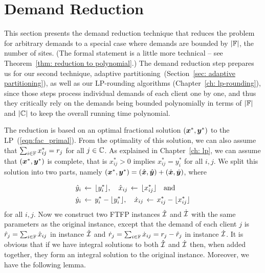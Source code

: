 \documentclass[oneside,final]{ucr}
\def\dsp{\def\baselinestretch{2.0}\large\normalsize}
\def\ssp{\def\baselinestretch{1.0}\large\normalsize}
\begin{document}
\section{Demand Reduction}
\label{sec: polynomial demands}

This section presents the demand reduction technique that
reduces the {\FTFP} problem for arbitrary demands to a
special case where demands are bounded by $|\mathbb{F}|$, the
number of sites.  (The formal statement is a little more
technical -- see Theorem~\ref{thm: reduction to
  polynomial}.)  The demand reduction step prepares us for
our second technique, adaptive
partitioning~(Section~\ref{sec: adaptive partitioning}), as
well as our LP-rounding algorithms (Chapter~\ref{ch:
  lp-rounding}), since those steps process individual
demands of each client one by one, and thus they critically
rely on the demands being bounded polynomially in terms of
$|\mathbb{F}|$ and $|\mathbb{C}|$ to keep the overall running
time polynomial.

The reduction is based on an optimal fractional solution
$(\boldsymbol{x}^\ast,\boldsymbol{y}^\ast)$ to the
LP~(\ref{eqn:fac_primal}). From the optimality of this
solution, we can also assume that $\sum_{i\in\mathbb{F}}
x^\ast_{ij} = r_j$ for all $j\in\mathbb{C}$.  As explained
in Chapter~\ref{ch: lp}, we can assume that
$(\boldsymbol{x}^\ast,\boldsymbol{y}^\ast)$ is complete, that is $x^\ast_{ij} >
0$ implies $x^\ast_{ij} = y^\ast_i$ for all $i,j$.  We split
this solution into two parts, namely $(\boldsymbol{x}^\ast,\boldsymbol{y}^\ast)
= (\hat{\boldsymbol{x}},\hat{\boldsymbol{y}})+ (\dot{\boldsymbol{x}},\dot{\boldsymbol{y}})$, where

\ssp
\begin{align*}
{\hat y}_i &\;{\,\leftarrow\,}\; { \lfloor y_i^\ast \rfloor }, \quad
			{\hat x}_{ij} \;{\,\leftarrow\,}\; { \lfloor x_{ij}^\ast \rfloor } \quad\textrm{and}
			\\
{\dot y}_i &\;{\,\leftarrow\,}\; y_i^\ast - { \lfloor y_i^\ast \rfloor }, \quad
 	{\dot x}_{ij} \;{\,\leftarrow\,}\; x_{ij}^\ast -  { \lfloor x_{ij}^\ast \rfloor }
\end{align*}
\dsp
for all $i,j$. Now we construct two
FTFP instances $\hatcalI$ and $\dotcalI$ with the same
parameters as the original instance, except that the demand of each client $j$ is
${\hat r}_j = \sum_{i\in\mathbb{F}} {\hat x}_{ij}$ in instance $\hatcalI$ and
${\dot r}_j = \sum_{i\in\mathbb{F}} {\dot x}_{ij} = r_j - {\hat r}_j$ in instance $\dotcalI$. 
It is obvious that if we have integral solutions to both $\hatcalI$
and $\dotcalI$ then, when added together, they form an integral
solution to the original instance.  Moreover, we have the
following lemma.
\end{document}
